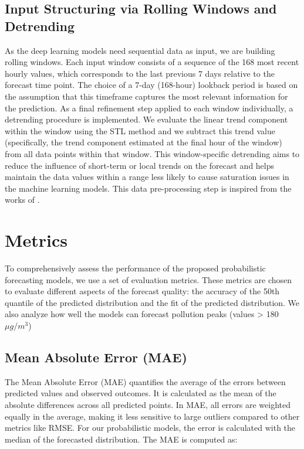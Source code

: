 \documentclass[12pt,a4paper]{book}
\begin{document}
\subsection{Input Structuring via Rolling Windows and Detrending}
\label{dataprep:rollingwindow} 
As the deep learning models need sequential data as input, we are building rolling windows. Each input window consists of a sequence of the 168 most recent hourly values, which corresponds to the last previous 7 days relative to the forecast time point. The choice of a 7-day (168-hour) lookback period is based on the assumption that this timeframe captures the most relevant information for the prediction. 
As a final refinement step applied to each window individually, a detrending procedure is implemented. We evaluate the linear trend component within the window using the STL method and we subtract this trend value (specifically, the trend component estimated at the final hour of the window) from all data points within that window. This window-specific detrending aims to reduce the influence of short-term or local trends on the forecast and helps maintain the data values within a range less likely to cause saturation issues in the machine learning models. This data pre-processing step is inspired from the works of \citet{hewamalage_advancing_2022}.

\section{Metrics}

\label{experiment:metrics}
To comprehensively assess the performance of the proposed probabilistic forecasting models, we use a set of evaluation metrics. These metrics are chosen to evaluate different aspects of the forecast quality: the accuracy of the 50th quantile of the predicted distribution and the fit of the predicted distribution. We also analyze how well the models can forecast pollution peaks (values > 180$\mu g/m^3$)

\subsection{Mean Absolute Error (MAE)}
\label{sec:mae}
The Mean Absolute Error (MAE) quantifies the average of the errors between predicted values and observed outcomes. It is calculated as the mean of the absolute differences across all predicted points. In MAE, all errors are weighted equally in the average, making it less sensitive to large outliers compared to other metrics like RMSE. For our probabilistic models, the error is calculated with the median of the forecasted distribution. The MAE is computed as:
\end{document}
